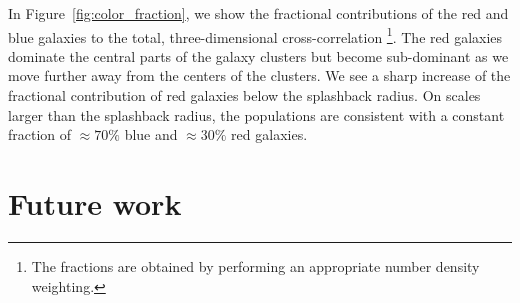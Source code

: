 \documentclass[iop, apjl, twocolappendix, numberedappendix]{emulateapj}
\begin{document}
In Figure~\ref{fig:color_fraction}, we show the fractional
contributions of the red and blue galaxies to the total,
three-dimensional cross-correlation \footnote{The fractions are
obtained by performing an appropriate number density weighting.}.
The red galaxies dominate the central parts of the galaxy clusters
but become sub-dominant as we move further away from the centers of the 
clusters. We see a sharp increase of the fractional contribution of
red galaxies below the splashback radius. On scales larger than the
splashback radius, the populations are consistent with a constant
fraction of $\approx 70\%$ blue and $\approx 30\%$ red galaxies.




\section{Future work}
\label{sec:Future}

\end{document}
